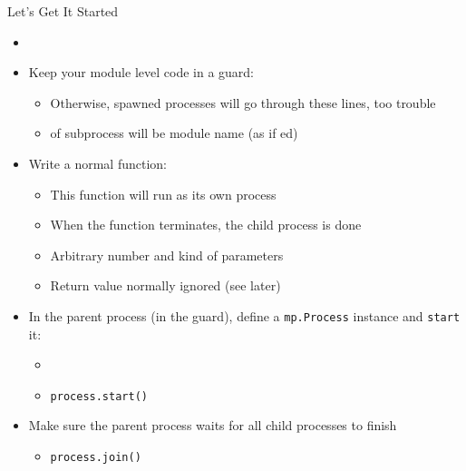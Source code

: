 \begin{frame}[fragile]{Let's Get It Started}
%
\begin{itemize}
\small
\item {}
\item Keep your module level code in a  guard:
	\begin{itemize}
	\item Otherwise, spawned processes will go through these lines, too \Thus trouble
	\item {} of subprocess will be module name (\ie as if ed)
	\end{itemize}
\item Write a normal function: 
	\begin{itemize}
	\item This function will run as its own process
	\item When the function terminates, the child process is done
	\item Arbitrary number and kind of parameters
	\item Return value normally ignored (see later)
	\end{itemize}
\item In the parent process (\zB in the  guard), define a \texttt{mp.Process} instance and \texttt{start} it:
	\begin{itemize}
	\item {}
	\item \texttt{process.start()}
	\end{itemize}
\item Make sure the parent process waits for all child processes to finish
	\begin{itemize}
	\item \texttt{process.join()}
	\end{itemize}
\end{itemize}
%
\end{frame}


